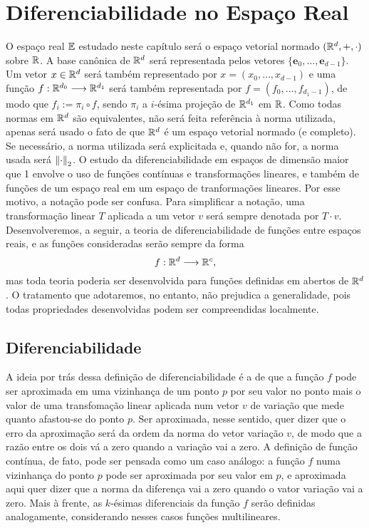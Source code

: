 \chapter{Diferenciabilidade no Espaço Real}

O espaço real $\mathbb{E}$ estudado neste capítulo será o espaço vetorial normado $(\mathbb{R}^d,+,\cdot)$ sobre $\mathbb{R}$. A base canônica de $\mathbb{R}^d$ será representada pelos vetores $\{\bm e_0, \ldots, \bm e_{d-1}\}$. Um vetor $x \in \mathbb{R}^d$ será também representado por $x=(x_0,\ldots,x_{d-1})$ e uma função $f: \mathbb{R}^{d_0} \longrightarrow \mathbb{R}^{d_1}$ será também representada por $f=(f_0,\ldots,f_{d_1-1})$, de modo que $f_i := \pi_i \circ f$, sendo $\pi_i$ a $i$-ésima projeção de $\mathbb{R}^{d_1}$ em $\mathbb{R}$. Como todas normas em $\mathbb{R}^d$ são equivalentes, não será feita referência à norma utilizada, apenas será usado o fato de que $\mathbb{R}^d$ é um espaço vetorial normado (e completo). Se necessário, a norma utilizada será explicitada e, quando não for, a norma usada será $\left\Vert{\cdot}\right\Vert_2$. O estudo da diferenciabilidade em espaços de dimensão maior que 1 envolve o uso de funções contínuas e transformações lineares, e também de funções de um espaço real em um espaço de tranformações lineares. Por esse motivo, a notação pode ser confusa. Para simplificar a notação, uma transformação linear $T$ aplicada a um vetor $v$ será sempre denotada por $T \cdot v$. Desenvolveremos, a seguir, a teoria de diferenciabilidade de funções entre espaços reais, e as funções consideradas serão sempre da forma
	\begin{equation*}
	f: \mathbb{R}^d \longrightarrow \mathbb{R}^c,
	\end{equation*}
mas toda teoria poderia ser desenvolvida para funções definidas em abertos de $\mathbb{R}^d$. O tratamento que adotaremos, no entanto, não prejudica a generalidade, pois todas propriedades desenvolvidas podem ser compreendidas localmente.

\section{Diferenciabilidade}

A ideia por trás dessa definição de diferenciabilidade é a de que a função $f$ pode ser aproximada em uma vizinhança de um ponto $p$ por seu valor no ponto mais o valor de uma transfomação linear aplicada num vetor $v$ de variação que mede quanto afastou-se do ponto $p$. Ser aproximada, nesse sentido, quer dizer que o erro da aproximação será da ordem da norma do vetor variação $v$, de modo que a razão entre os dois vá a zero quando a variação vai a zero. A definição de função contínua, de fato, pode ser pensada como um caso análogo: a função $f$ numa vizinhança do ponto $p$ pode ser aproximada por seu valor em $p$, e aproximada aqui quer dizer que a norma da diferença vai a zero quando o vator variação vai a zero. Mais à frente, as $k$-ésimas diferenciais da função $f$ serão definidas analogamente, considerando nesses casos funções multilineares.

